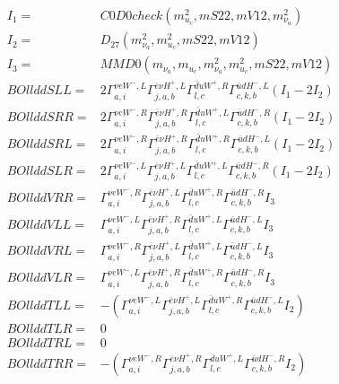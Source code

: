 \documentclass[A4,landscape]{article}
\begin{document}
\begin{align} 
I_1 = & C0D0check(m^2_{u_{{c}}}, mS22, mV12, m^2_{\nu_{{a}}}) \\ 
I_2 = & D_{27}(m^2_{\nu_{{a}}}, m^2_{u_{{c}}}, mS22, mV12) \\ 
I_3 = & MMD0(m_{\nu_{{a}}}, m_{u_{{c}}}, m^2_{\nu_{{a}}}, m^2_{u_{{c}}}, mS22, mV12) \\ 
  BOllddSLL= & 2  \Gamma^{\nu e W^-,L}_{a, i} \Gamma^{\bar{e}\nu H^+,L}_{j, a, b} \Gamma^{\bar{d}u W^+ ,R}_{l, c} \Gamma^{\bar{u}d H^- ,L}_{c, k, b} (I_1 - 2 I_2) \\ 
  BOllddSRR= & 2  \Gamma^{\nu e W^-,R}_{a, i} \Gamma^{\bar{e}\nu H^+,R}_{j, a, b} \Gamma^{\bar{d}u W^+ ,L}_{l, c} \Gamma^{\bar{u}d H^- ,R}_{c, k, b} (I_1 - 2 I_2) \\ 
  BOllddSRL= & 2  \Gamma^{\nu e W^-,R}_{a, i} \Gamma^{\bar{e}\nu H^+,R}_{j, a, b} \Gamma^{\bar{d}u W^+ ,R}_{l, c} \Gamma^{\bar{u}d H^- ,L}_{c, k, b} (I_1 - 2 I_2) \\ 
  BOllddSLR= & 2  \Gamma^{\nu e W^-,L}_{a, i} \Gamma^{\bar{e}\nu H^+,L}_{j, a, b} \Gamma^{\bar{d}u W^+ ,L}_{l, c} \Gamma^{\bar{u}d H^- ,R}_{c, k, b} (I_1 - 2 I_2) \\ 
  BOllddVRR= &  \Gamma^{\nu e W^-,R}_{a, i} \Gamma^{\bar{e}\nu H^+,L}_{j, a, b} \Gamma^{\bar{d}u W^+ ,R}_{l, c} \Gamma^{\bar{u}d H^- ,R}_{c, k, b} I_3 \\ 
  BOllddVLL= &  \Gamma^{\nu e W^-,L}_{a, i} \Gamma^{\bar{e}\nu H^+,R}_{j, a, b} \Gamma^{\bar{d}u W^+ ,L}_{l, c} \Gamma^{\bar{u}d H^- ,L}_{c, k, b} I_3 \\ 
  BOllddVRL= &  \Gamma^{\nu e W^-,R}_{a, i} \Gamma^{\bar{e}\nu H^+,L}_{j, a, b} \Gamma^{\bar{d}u W^+ ,L}_{l, c} \Gamma^{\bar{u}d H^- ,L}_{c, k, b} I_3 \\ 
  BOllddVLR= &  \Gamma^{\nu e W^-,L}_{a, i} \Gamma^{\bar{e}\nu H^+,R}_{j, a, b} \Gamma^{\bar{d}u W^+ ,R}_{l, c} \Gamma^{\bar{u}d H^- ,R}_{c, k, b} I_3 \\ 
  BOllddTLL= & -( \Gamma^{\nu e W^-,L}_{a, i} \Gamma^{\bar{e}\nu H^+,L}_{j, a, b} \Gamma^{\bar{d}u W^+ ,R}_{l, c} \Gamma^{\bar{u}d H^- ,L}_{c, k, b} I_2) \\ 
  BOllddTLR= & 0 \\ 
  BOllddTRL= & 0 \\ 
  BOllddTRR= & -( \Gamma^{\nu e W^-,R}_{a, i} \Gamma^{\bar{e}\nu H^+,R}_{j, a, b} \Gamma^{\bar{d}u W^+ ,L}_{l, c} \Gamma^{\bar{u}d H^- ,R}_{c, k, b} I_2) \\ 
\end{align} 
\end{document}
